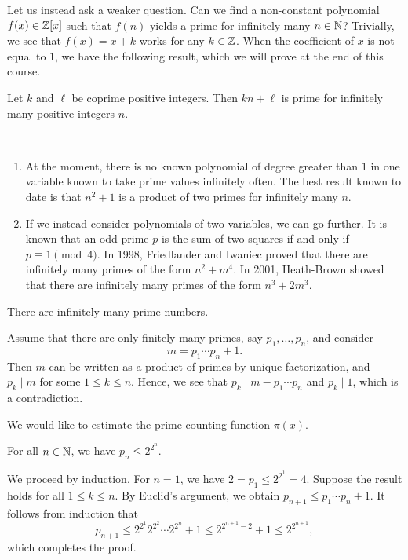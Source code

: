 Let us instead ask a weaker question. Can we find a non-constant polynomial $f(x) \in \mathbb{Z}[x]$ such that 
$f(n)$ yields a prime for infinitely many $n \in \mathbb{N}$? Trivially, we see that $f(x) = x+k$ works 
for any $k \in \mathbb{Z}$. When the coefficient of $x$ is not equal to $1$, we have the following result, 
which we will prove at the end of this course.

\begin{thm}[Dirichlet]
Let $k$ and $\ell$ be coprime positive integers. Then $kn+\ell$ is prime for infinitely many positive
integers $n$. 
\end{thm}

\begin{remark}~
\begin{enumerate}[(1)]
    \item At the moment, there is no known polynomial of degree greater than $1$ in one variable 
    known to take prime values infinitely often. The best result known to date is that $n^2+1$ is 
    a product of two primes for infinitely many $n$.
    \item If we instead consider polynomials of two variables, we can go further. It is known that 
    an odd prime $p$ is the sum of two squares if and only if $p \equiv 1 \pmod 4$. 
    In 1998, Friedlander and Iwaniec proved that there are infinitely many primes of the 
    form $n^2 + m^4$. In 2001, Heath-Brown showed that there are infinitely many primes of 
    the form $n^3 + 2m^3$. 
\end{enumerate}
\end{remark}

\begin{thm}[Euclid]
There are infinitely many prime numbers.
\end{thm}
\begin{pf}
Assume that there are only finitely many primes, say $p_1, \dots, p_n$, and consider 
\[ m = p_1 \cdots p_n + 1. \]
Then $m$ can be written as a product of primes by unique factorization, and $p_k \mid m$ for some $1 \leq
k \leq n$. 
Hence, we see that $p_k \mid m - p_1 \cdots p_n$ and $p_k \mid 1$, which is a contradiction. 
\end{pf}

We would like to estimate the prime counting function $\pi(x)$. 

\begin{prop}
For all $n \in \mathbb{N}$, we have $p_n \leq 2^{2^n}$. 
\end{prop}
\begin{pf}
We proceed by induction. For $n = 1$, we have $2 = p_1 \leq 2^{2^1} = 4$. Suppose the result 
holds for all $1 \leq k \leq n$. By Euclid's argument, we obtain $p_{n+1} \leq p_1 \cdots p_n + 1$. 
It follows from induction that 
\[ p_{n+1} \leq 2^{2^1} 2^{2^2} \cdots 2^{2^n} + 1 \leq 2^{2^{n+1}-2} + 1 \leq 2^{2^{n+1}}, \]
which completes the proof. 
\end{pf}

